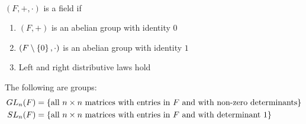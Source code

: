 \begin{definition}[Field] \leavevmode \\
    $(F, +, \cdot)$ is a field if
    \begin{enumerate}
        \item $(F, +)$ is an abelian group with identity $0$
        \item $(F\setminus\left\{0\right\}, \cdot)$ is an abelian group with identity $1$
        \item Left and right distributive laws hold
    \end{enumerate}
\end{definition}

The following are groups:
\begin{align*}
    GL_n(F) &= \left\{\text{all $n\times n$ matrices with entries in $F$ and with non-zero determinants}\right\} \\
    SL_n(F) &= \left\{\text{all $n\times n$ matrices with entries in $F$ and with determinant $1$}\right\}
\end{align*}